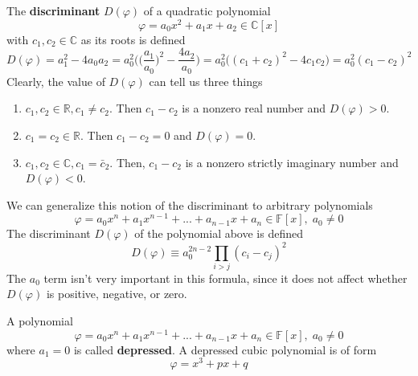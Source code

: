   \begin{definition}
    The \textbf{discriminant} $D(\varphi)$ of a quadratic polynomial
    \begin{equation}
      \varphi = a_0 x^2 + a_1 x + a_2 \in \mathbb{C}[x]
    \end{equation}
    with $c_1, c_2 \in \mathbb{C}$ as its roots is defined
    \begin{equation}
      D(\varphi) = a_1^2 - 4 a_0 a_2 = a_0^2 \bigg( \Big(\frac{a_1}{a_0} \Big)^2 - \frac{4 a_2}{a_0} \bigg) = a_0^2 \big( (c_1 + c_2)^2 - 4 c_1 c_2 \big) = a_0^2 (c_1 - c_2)^2
    \end{equation}
    Clearly, the value of $D(\varphi)$ can tell us three things
    \begin{enumerate}
      \item $c_1, c_2 \in \mathbb{R}, c_1 \neq c_2$. Then $c_1 - c_2$ is a nonzero real number and $D(\varphi) > 0$. 
      \item $c_1 = c_2 \in \mathbb{R}$. Then $c_1 - c_2 = 0$ and $D(\varphi) = 0$. 
      \item $c_1, c_2 \in \mathbb{C}, c_1 = \bar{c}_2$. Then, $c_1 - c_2$ is a nonzero strictly imaginary number and $D(\varphi) < 0$. 
    \end{enumerate}
  \end{definition}

  \begin{definition}
    We can generalize this notion of the discriminant to arbitrary polynomials
    \begin{equation}
      \varphi = a_0 x^n + a_1 x^{n-1} + ... + a_{n-1} x + a_n \in \mathbb{F}[x], \; a_0 \neq 0
    \end{equation}
    The discriminant $D(\varphi)$ of the polynomial above is defined
    \begin{equation}
      D(\varphi) \equiv a_0^{2n-2} \prod_{i>j} (c_i - c_j)^2
    \end{equation}
    The $a_0$ term isn't very important in this formula, since it does not affect whether $D(\varphi)$ is positive, negative, or zero. 
  \end{definition}

  \begin{definition}
    A polynomial 
    \begin{equation}
      \varphi = a_0 x^n + a_1 x^{n-1} + ... + a_{n-1} x + a_n \in \mathbb{F}[x], \; a_0 \neq 0
    \end{equation}
    where $a_1 = 0$ is called \textbf{depressed}. A depressed cubic polynomial is of form
    \begin{equation}
      \varphi = x^3 + p x + q
    \end{equation}
  \end{definition}

